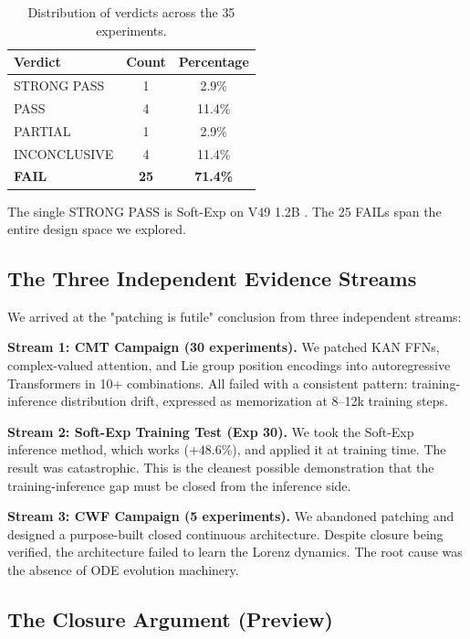 \documentclass{article}
\begin{document}
\begin{table}[h]
\centering
\small
\begin{tabular}{lcc}
\toprule
Verdict & Count & Percentage \\
\midrule
STRONG PASS & 1 & 2.9\% \\
PASS & 4 & 11.4\% \\
PARTIAL & 1 & 2.9\% \\
INCONCLUSIVE & 4 & 11.4\% \\
\textbf{FAIL} & \textbf{25} & \textbf{71.4\%} \\
\bottomrule
\end{tabular}
\caption{Distribution of verdicts across the 35 experiments.}
\label{tab:verdicts}
\end{table}

The single STRONG PASS is Soft-Exp on V49 1.2B \citep{wang2026softexp}. The 25 FAILs span the entire design space we explored.

\subsection{The Three Independent Evidence Streams}

We arrived at the "patching is futile" conclusion from three independent streams:

\textbf{Stream 1: CMT Campaign (30 experiments).} We patched KAN FFNs, complex-valued attention, and Lie group position encodings into autoregressive Transformers in 10+ combinations. All failed with a consistent pattern: training-inference distribution drift, expressed as memorization at 8--12k training steps.

\textbf{Stream 2: Soft-Exp Training Test (Exp 30).} We took the Soft-Exp inference method, which works ($+48.6\%$), and applied it at training time. The result was catastrophic. This is the cleanest possible demonstration that the training-inference gap must be closed from the inference side.

\textbf{Stream 3: CWF Campaign (5 experiments).} We abandoned patching and designed a purpose-built closed continuous architecture. Despite closure being verified, the architecture failed to learn the Lorenz dynamics. The root cause was the absence of ODE evolution machinery.

\subsection{The Closure Argument (Preview)}
\end{document}
